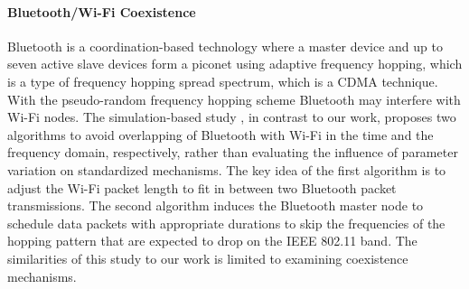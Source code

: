 \paragraph{Bluetooth/Wi-Fi Coexistence}
Bluetooth is a coordination-based technology where a master device and up to seven active slave devices form a piconet using adaptive frequency hopping, which is a type of frequency hopping spread spectrum, which is a CDMA technique. With the pseudo-random frequency hopping scheme Bluetooth may interfere with Wi-Fi nodes. The simulation-based study \cite{chiasserini02}, in contrast to our work, proposes two algorithms to avoid overlapping of Bluetooth with Wi-Fi in the time and the frequency domain, respectively, rather than evaluating the influence of parameter variation on standardized mechanisms. The key idea of the first algorithm is to adjust the Wi-Fi packet length to fit in between two Bluetooth packet transmissions. The second algorithm induces the Bluetooth master node to schedule data packets with appropriate durations to skip the frequencies of the hopping pattern that are expected to drop on the IEEE 802.11 band. The similarities of this study to our work is limited to examining coexistence mechanisms.